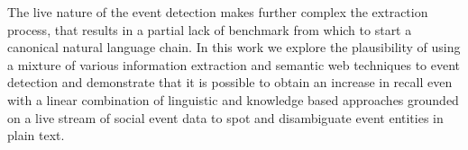 \documentclass[10pt,a4paper]{article}
\begin{document}
The live nature of the event detection makes further complex the extraction process, that results in a partial lack of benchmark from which to start a canonical natural language chain. In this work we explore the plausibility of using a mixture of various information extraction and semantic web techniques to event detection and demonstrate that it is possible to obtain an increase in recall even with a linear combination of linguistic and knowledge based approaches grounded on a live stream of social event data to spot and disambiguate event entities in plain text.
\end{document}
